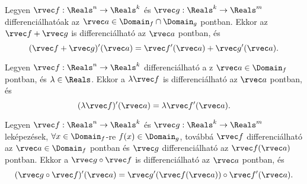 \begin{statement}
  Legyen $\rvec f: \Reals^n \to \Reals^k$ és $\rvec g: \Reals^k \to \Reals^m$
  differenciálhatóak az $\rvec a \in \Domain_f \cap \Domain_g$ pontban. Ekkor
  az $\rvec f + \rvec g$ is differenciálható az $\rvec a$ pontban, és
  $$
    (\rvec f + \rvec g)'(\rvec a) = \rvec f'(\rvec a) + \rvec g'(\rvec a)
    \text.
  $$
\end{statement}

\begin{statement}
  Legyen $\rvec f: \Reals^n \to \Reals^k$ differenciálható a
  z $\rvec a \in \Domain_f$ pontban, és $\lambda \in \Reals$. Ekkor a
  $\lambda \rvec f$ is differenciálható az $\rvec a$ pontban, és
  $$
    (\lambda \rvec f)'(\rvec a) = \lambda \rvec f'(\rvec a)
    \text.
  $$
\end{statement}

\begin{statement}
  Legyen $\rvec f: \Reals^n \to \Reals^k$ és $\rvec g: \Reals^k \to \Reals^m$
  leképezések, $\forall x \in \Domain_f$-re $f(x) \in \Domain_g$, továbbá
  $\rvec f$ differenciálható az $\rvec a \in \Domain_f$ pontban és
  $\rvec g$ differenciálható az $\rvec f(\rvec a)$ pontban. Ekkor a
  $\rvec g \circ \rvec f$ is differenciálható az $\rvec a$ pontban, és
  $$
    (\rvec g \circ \rvec f)'(\rvec a) = \rvec g'(\rvec f(\rvec a)) \circ \rvec f'(\rvec a)
    \text.
  $$
\end{statement}